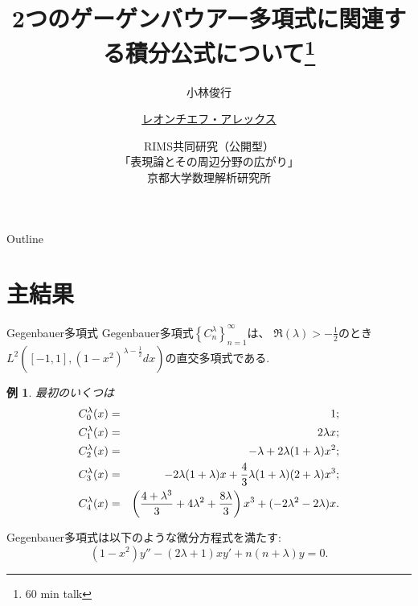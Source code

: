 \documentclass[pdf,notes]{beamer}
\title[2つのゲーゲンバウアー多項式に\dots]{2つのゲーゲンバウアー多項式に関連する積分公式について\footnote{60 min talk}}
\author[レオンチエフ・アレックス]{小林俊行\inst{1} \and \underline{レオンチエフ・アレックス}\inst{2}}
\institute[東大] %
{
  \inst{1}%
  大学院数理科学研究科、カブリ数物連携宇宙研究機構\\
  東京大学
  \and
  \inst{2}%
  大学院数理科学研究科\\
  東京大学
  }
\date[表現論とその周辺分野\dots]{RIMS共同研究（公開型）\\「表現論とその周辺分野の広がり」\\京都大学数理解析研究所}
\newtheorem*{example*}{例}
\begin{document}
\begin{frame}\titlepage\end{frame}

\begin{frame}{Outline}
	\tableofcontents
\end{frame}
\section{主結果}
\begin{frame}{Gegenbauer多項式}%
	Gegenbauer多項式$\left\{ C_n^\lambda \right\}_{n=1}^{\infty}$は、
	$\Re(\lambda)>-\frac{1}{2}$のとき$L^2\left( [-1,1],(1-x^2)^{\lambda-\frac{1}{2}}dx \right)$の直交多項式である.
	\vspace{-0.2cm}
	\begin{example*}
		最初のいくつは
	\vspace{-0.3cm}
		\begin{eqnarray*}
	\vspace{-0.2cm}
			C_0^\lambda(x)&=&1;\\
			C_1^\lambda(x)&=&2\lambda x;\\
			C_2^\lambda(x)&=&-\lambda+2\lambda(1+\lambda)x^2;\\
			C_3^\lambda(x)&=&-2\lambda(1+\lambda)x+\frac{4}{3}\lambda(1+\lambda)(2+\lambda)x^3;\\
			C_4^\lambda(x)&=&\left(\frac{4+\lambda^3}{3}+4\lambda^2+\frac{8\lambda}{3}  \right)x^3+(-2\lambda^2-2\lambda)x.
		\end{eqnarray*}
	\end{example*}
	Gegenbauer多項式は以下のような微分方程式を満たす:
		\vspace{-0.2cm}
	\begin{equation*}
		(1-x^2)y''-(2\lambda+1)xy'+n(n+\lambda)y=0.
	\end{equation*}
\end{frame}
\end{document}
